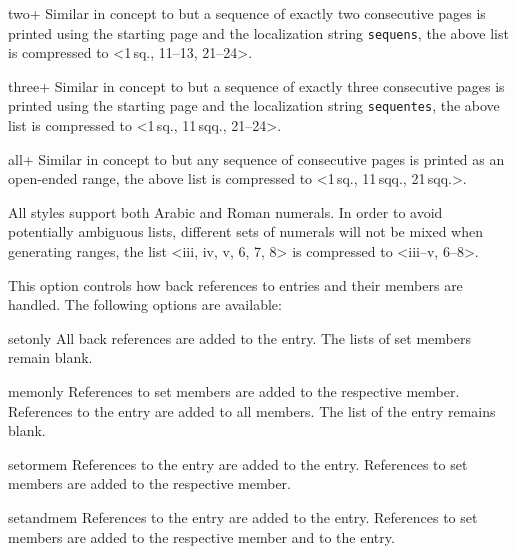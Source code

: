 \documentclass{ltxdockit}[2011/03/25]
\begin{document}
\begin{optionlist}
\begin{valuelist}
\item[two+] Similar in concept to  but a sequence of exactly two consecutive pages is printed using the starting page and the localization string \texttt{sequens}, \eg the above list is compressed to <1\,sq., 11--13, 21--24>.

\item[three+] Similar in concept to  but a sequence of exactly three consecutive pages is printed using the starting page and the localization string \texttt{sequentes}, \eg the above list is compressed to <1\,sq., 11\,sqq., 21--24>.

\item[all+] Similar in concept to  but any sequence of consecutive pages is printed as an open-ended range, \eg the above list is compressed to <1\,sq., 11\,sqq., 21\,sqq.>.

\end{valuelist}

All styles support both Arabic and Roman numerals. In order to avoid potentially ambiguous lists, different sets of numerals will not be mixed when generating ranges, \eg the list <iii, iv, v, 6, 7, 8> is compressed to <iii--v, 6--8>.


This option controls how back references to  entries and their members are handled. The following options are available:

\begin{valuelist}

\item[setonly] All back references are added to the  entry. The  lists of set members remain blank.

\item[memonly] References to set members are added to the respective member. References to the  entry are added to all members. The  list of the  entry remains blank.

\item[setormem] References to the  entry are added to the  entry. References to set members are added to the respective member.

\item[setandmem] References to the  entry are added to the  entry. References to set members are added to the respective member and to the  entry.


\end{valuelist}
\end{optionlist}
\end{document}
